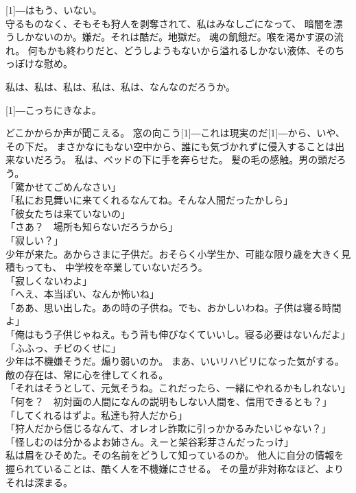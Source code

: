 \documentclass[../IHMain]{subfiles}
\begin{document}
\scalebox{3}[1]{―}はもう、いない。\\

守るものなく、そもそも狩人を剥奪されて、私はみなしごになって、
暗闇を漂うしかないのか。嫌だ。それは酷だ。地獄だ。
魂の飢餓だ。喉を渇かす涙の流れ。
何もかも終わりだと、どうしようもないから溢れるしかない液体、そのちっぽけな慰め。

私は、私は、私は、私は、私は、なんなのだろうか。

\scalebox{3}[1]{―}こっちにきなよ。

どこかからか声が聞こえる。
窓の向こう\scalebox{3}[1]{―}これは現実のだ\scalebox{3}[1]{―}から、いや、その下だ。
まさかなにもない空中から、誰にも気づかれずに侵入することは出来ないだろう。
私は、ベッドの下に手を奔らせた。
髪の毛の感触。男の頭だろう。\\
「驚かせてごめんなさい」\\
「私にお見舞いに来てくれるなんてね。そんな人間だったかしら」\\
「彼女たちは来ていないの」\\
「さあ？　場所も知らないだろうから」\\
「寂しい？」\\
少年が来た。あからさまに子供だ。おそらく小学生か、可能な限り歳を大きく見積もっても、
中学校を卒業していないだろう。\\
「寂しくないわよ」\\
「へえ、本当ぽい、なんか怖いね」\\
「ああ、思い出した。あの時の子供ね。でも、おかしいわね。子供は寝る時間よ」\\
「俺はもう子供じゃねえ。もう背も伸びなくていいし。寝る必要はないんだよ」\\
「ふふっ、チビのくせに」\\
少年は不機嫌そうだ。煽り弱いのか。
まあ、いいリハビリになった気がする。
敵の存在は、常に心を律してくれる。\\
「それはそうとして、元気そうね。これだったら、一緒にやれるかもしれない」\\
「何を？　初対面の人間になんの説明もしない人間を、信用できるとも？」\\
「してくれるはずよ。私達も狩人だから」\\
「狩人だから信じるなんて、オレオレ詐欺に引っかかるみたいじゃない？」\\
「怪しむのは分かるよお姉さん。えーと架谷彩芽さんだったっけ」\\
私は眉をひそめた。その名前をどうして知っているのか。
他人に自分の情報を握られていることは、酷く人を不機嫌にさせる。
その量が非対称なほど、よりそれは深まる。\\
\end{document}
